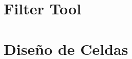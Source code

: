 






\tableofcontents
\newpage


\section{Filter Tool}
	
\newpage	
\section{Diseño de Celdas}
  


